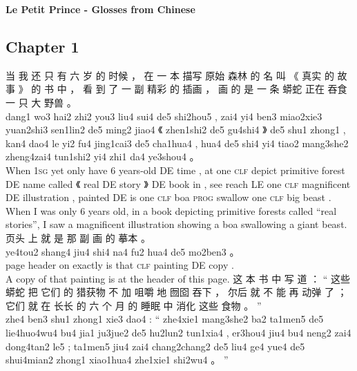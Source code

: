\documentclass[UTF8]{ctexart}
\begin{document}
\begin{center}
\textbf{\Large{Le Petit Prince - Glosses from Chinese}}\\
\end{center}

\subsection*{Chapter 1}

\begin{exe}
\ex 
\glll
当 我 还 只 有 六 岁 的 时候 ， 在 一 本 描写 原始 森林 的 名 叫 《 真实 的 故事 》 的 书 中 ， 看 到 了 一 副 精彩 的 插画 ， 画 的 是 一 条 蟒蛇 正在 吞食 一 只 大 野兽 。
\\
dang1 wo3 hai2 zhi2 you3 liu4 sui4 de5 shi2hou5 , zai4 yi4 ben3 miao2xie3 yuan2shi3 sen1lin2 de5 ming2 jiao4 《 zhen1shi2 de5 gu4shi4 》 de5 shu1 zhong1 , kan4 dao4 le yi2 fu4 jing1cai3 de5 cha1hua4 , hua4 de5 shi4 yi4 tiao2 mang3she2 zheng4zai4 tun1shi2 yi4 zhi1 da4 ye3shou4 。
\\
When \textsc{1sg} yet only have 6 years-old DE time , at one \textsc{clf} depict primitive forest DE name called 《 real DE story 》 DE book in , see reach LE one \textsc{clf} magnificent DE illustration , painted DE is one \textsc{clf} boa \textsc{prog} swallow one \textsc{clf} big beast . 
\\
\trans When I was only 6 years old, in a book depicting primitive forests called ``real stories'', I saw a magnificent illustration showing a boa swallowing a giant beast. 
\ex
\glll
页头 上 就 是 那 副 画 的 摹本 。 
\\
ye4tou2 shang4 jiu4 shi4 na4 fu2 hua4 de5 mo2ben3 。
\\
{page header} on exactly is that \textsc{clf} painting DE copy .
\\
\trans A copy of that painting is at the header of this page. 
\ex
\glll
这 本 书 中 写 道 ： `` 这些 蟒蛇 把 它们 的 猎获物 不 加 咀嚼 地 囫囵 吞下 ， 尔后 就 不 能 再 动弹 了 ； 它们 就 在 长长 的 六 个 月 的 睡眠 中 消化 这些 食物 。 '' 
\\
zhe4 ben3 shu1 zhong1 xie3 dao4 : `` zhe4xie1 mang3she2 ba2 ta1men5 de5 lie4huo4wu4 bu4 jia1 ju3jue2 de5 hu2lun2 tun1xia4 , er3hou4 jiu4 bu4 neng2 zai4 dong4tan2 le5 ; ta1men5 jiu4 zai4 chang2chang2 de5 liu4 ge4 yue4 de5 shui4mian2 zhong1 xiao1hua4 zhe1xie1 shi2wu4 。 ''
\\

\end{exe}
\end{document}
